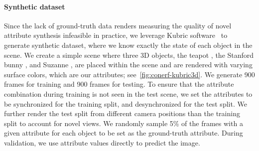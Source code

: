     \paragraph{Synthetic dataset}
      Since the lack of ground-truth data renders measuring the quality of novel
      attribute synthesis infeasible in practice, we leverage Kubric
      software~\cite{kubric2021github} to generate synthetic dataset, where we know
      exactly the state of each object in the scene.
      We create a simple scene where three 3D objects, the teapot \cite{teapot}, the
      Stanford bunny \cite{bunny}, and Suzanne \cite{suzanne}, are placed within the
      scene and are rendered with varying surface colors, which are our attributes;
      see~\cref{fig:conerf-kubric3d}.
      We generate 900 frames for training and 900 frames for testing.
      To ensure that the attribute combination during training is not seen in the
      test scene, we set the attributes to be synchronized for the training split,
      and desynchronized for the test split.
      We further render the test split from different camera positions than the
      training split to account for novel views.
      We randomly sample 5\% of the frames with a given attribute for each object to
      be set as the ground-truth attribute.
      During validation, we use attribute values directly to predict the image.

